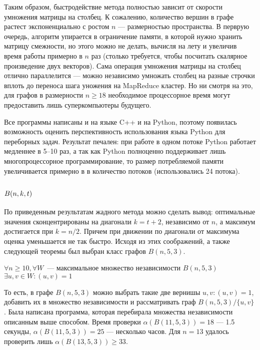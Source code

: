 Таким образом, быстродействие метода полностью зависит от скорости умножения
матрицы на столбец.
К сожалению, количество вершин в графе растест экспоненциально с
ростом $n$ --- размерностью пространства. В перврую очередь, алгоритм упирается
в ограничение памяти, в которой нужно хранить матрицу смежности, но этого можно
не делать, вычисля на лету и увеличив время работы примерно в $n$ раз
(столько требуется, чтобы посчитать скалярное произведение двух векторов).
Сама операция умножения
матрицы на столбец отлично параллелится --- можно независимо умножать
столбец на разные строчки вплоть до переноса шага уножения на MapReduce
кластер.  Но ни смотря на это, для графов в размерности $n \geq 18$
необходимое процессорное время могут предоставить
лишь суперкомпьютеры будущего.

Все программы написаны и на языке C++ и на Python, поэтому появилась
возможность оценить перспективность использования языка Python для переборных
задач. Результат печален: при работе в одном потоке Python работает медленнее
в 5--10 раз, а так как Python полноценно поддерживает лишь многопроцессорное
программирование, то размер потребляемой памяти увеличивается примерно в
в количество потоков (использовались 24 потока).

\subsection{$B(n,k,t)$}

По приведенным результатам жадного метода можно сделать вывод: оптимальные
значения сконцентрированы на диагонали $k=t+2$, независимо от $n$, а максимум
достигается при $k=n/2$. Причем при движении по диагонали от максимума
оценка уменьшается не так быстро. Исходя из этих соображений, а также следующей
теоремы был выбран класс графов $B(n,5,3)$.
\begin{theorem}
    $\forall n \geq 10, \forall W$~--- максимальное множество независимости
    $B(n,5,3)$ $\exists u,v \in W: (u,v)=1$
\end{theorem}

То есть, в графе $B(n,5,3)$ можно выбрать такие две вернишы
$u,v: (u,v)=1$, добавить их в множество независимости и рассматривать
граф $B(n,5,3) /\{u,v\}$. Была написана программа, которая
перебирала множества независимости описанным выше способом. Время проверки
$\alpha(B(11,5,3))=18$ --- 1.5 секунды, $\alpha(B(11,5,3))=25$ ---
несколько часов. Для $n=13$ удалось проверить лишь $\alpha(B(13,5,3))\geq33$.

